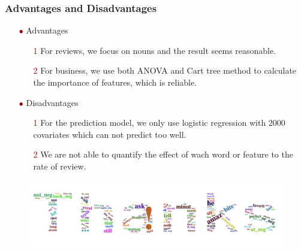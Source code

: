 \documentclass[notheorems, aspectratio=54]{beamer}
\renewcommand\textbullet{\ensuremath{\bullet}}
\begin{document}
\begin{frame}
\frametitle{Advantages and Disadvantages}
\begin{itemize}
	\item[\textcolor{darkred}{\textbullet}] Advantages
	\begin{itemize}
		\item[\textcolor{darkred}{1}] For reviews, we focus on nouns and the result seems reasonable.
		\item[\textcolor{darkred}{2}] For business, we use both ANOVA and Cart tree method to calculate the importance of features, which is reliable.
	\end{itemize}
\vspace{2ex}

	\item[\textcolor{darkred}{\textbullet}] Disadvantages
	\begin{itemize}
		\item[\textcolor{darkred}{1}] For the prediction model, we only use logistic regression with 2000 covariates which can not predict too well.
		\item[\textcolor{darkred}{2}] We are not able to quantify the effect of wach word or feature to the rate of review.
	\end{itemize}
\end{itemize}

\end{frame}

\begin{frame}
\begin{figure}[H]
	\centering
	\includegraphics[width=4.6in]{thanks.jpg}
\end{figure}
\end{frame}
\end{document}
